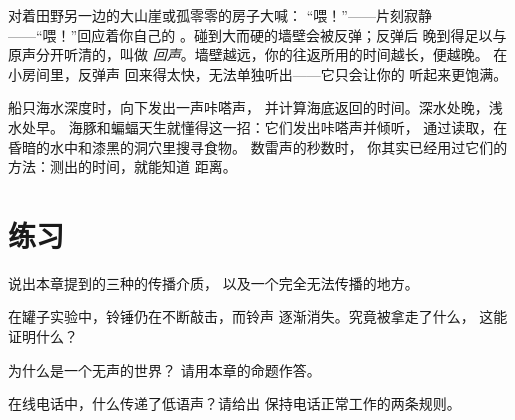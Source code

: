 \begin{example}[回声]\label{ex:g4:how-sound-travels:echo}
对着田野另一边的大山崖或孤零零的房子大喊：
“喂！”——片刻寂静——“喂！”回应着你自己的
。碰到大而硬的墙壁会被反弹；反弹后
晚到得足以与原声分开听清的，叫做
\emph{回声}。墙壁越远，你的往返所用的时间越长，便越晚。
在小房间里，反弹声
回来得太快，无法单独听出——它只会让你的
听起来更饱满。
\end{example}

\begin{remark}[声呐：被利用起来的回声]\label{rem:g4:how-sound-travels:sonar}
船只海水深度时，向下发出一声咔嗒声，
并计算海底返回的时间。深水处晚，浅水处早。
海豚和蝙蝠天生就懂得这一招：它们发出咔嗒声并倾听，
通过读取，在昏暗的水中和漆黑的洞穴里搜寻食物。
数雷声的秒数时，
你其实已经用过它们的方法：测出的时间，就能知道
距离。
\end{remark}

\section{练习}

\begin{exercise}[$\star$]\label{exo:g4:how-sound-travels:1}
说出本章提到的三种的传播介质，
以及一个完全无法传播的地方。
\end{exercise}

\begin{exercise}[$\star$]\label{exo:g4:how-sound-travels:2}
在罐子实验中，铃锤仍在不断敲击，而铃声
逐渐消失。究竟被拿走了什么，
这能证明什么？
\end{exercise}

\begin{exercise}[$\star$]\label{exo:g4:how-sound-travels:3}
为什么是一个无声的世界？
请用本章的命题作答。
\end{exercise}

\begin{exercise}[$\star$]\label{exo:g4:how-sound-travels:4}
在线电话中，什么传递了低语声？请给出
保持电话正常工作的两条规则。
\end{exercise}


